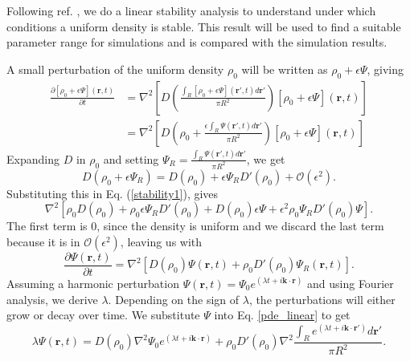 \documentclass{article}
\renewcommand{\vec}[1]{\boldsymbol{#1}}
\begin{document}
Following ref. \cite{lopezMacroscopicDescriptionParticle2006}, we do a linear stability analysis to understand under which conditions a uniform density is stable. 
This result will be used to find a suitable parameter range for simulations and is compared with the simulation results.

A small perturbation of the uniform density $\rho_0$ will be written as $\rho_0 + \epsilon \Psi$, giving
\begin{align}
    \frac{\partial[\rho_0 + \epsilon \Psi](\vec{r},t)}{\partial t} &= \nabla^2\left[D\left(\frac{\int_{R} [\rho_0+\epsilon \Psi](\vec{r}',t)d\vec{r}'}{\pi R^2}\right)[\rho_0+\epsilon \Psi](\vec{r},t)\right]\\
    &= \nabla^2\left[D\left(\rho_0+\frac{\epsilon\int_{R} \Psi(\vec{r}',t)d\vec{r}'}{\pi R^2}\right)[\rho_0+\epsilon \Psi](\vec{r},t)\right] \label{stability1}
\end{align}
Expanding $D$ in $\rho_0$ and setting $\Psi_R = \frac{\int_{R} \Psi(\vec{r}',t)d\vec{r}'}{\pi R^2}$, we get 
\begin{equation}
    D(\rho_0+\epsilon \Psi_R) = D(\rho_0) + \epsilon \Psi_R D'(\rho_0) + \mathcal{O}(\epsilon^2).
\end{equation}
Substituting this in Eq. (\ref{stability1}), gives
\begin{equation}
\nabla^2\left[\rho_0 D(\rho_0) + \rho_0\epsilon \Psi_R D'(\rho_0)+ D(\rho_0)\epsilon \Psi + \epsilon^2 \rho_0 \Psi_R D'(\rho_0) \Psi\right].
\end{equation}
The first term is $0$, since the density is uniform and we discard the last term because it is in $\mathcal{O}(\epsilon^2)$, leaving us with
\begin{equation} \label{pde_linear}
    \frac{\partial \Psi(\vec{r},t)}{\partial t} = \nabla^2\left[ D(\rho_0) \Psi(\vec{r},t)+\rho_0  D'(\rho_0)\Psi_R(\vec{r},t)  \right].
\end{equation}
Assuming a harmonic perturbation $\Psi(\vec{r}, t) = \Psi_0 e^{(\lambda t + i \vec{k} \cdot \vec{r})}$ and using Fourier analysis, we derive $\lambda$.
Depending on the sign of $\lambda$, the perturbations will either grow or decay over time.
We substitute $\Psi$ into Eq. \ref{pde_linear} to get
\begin{equation} \label{pde_substituted}
    \lambda \Psi(\vec{r},t) = D(\rho_0) \nabla^2\Psi_0 e^{(\lambda t + i \vec{k} \cdot \vec{r})} +  \rho_0  D'(\rho_0) \nabla^2\frac{\int_{R} e^{(\lambda t + i \vec{k} \cdot \vec{r'})}d\vec{r'}}{\pi R^2}.
\end{equation}
\end{document}
